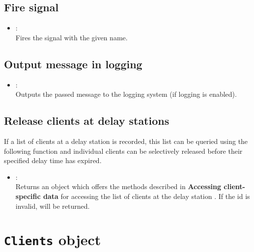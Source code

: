 \section{Fire signal}

\begin{itemize}

\item
{}:\\
Fires the signal with the given name.

\end{itemize}

\section{Output message in logging}

\begin{itemize}

\item
{}:\\
Outputs the passed message to the logging system (if logging is enabled).

\end{itemize}

\section{Release clients at delay stations}

If a list of clients at a delay station is recorded, this list can be queried using the
following function and individual clients can be selectively released before their
specified delay time has expired.

\begin{itemize}

\item
{}:\\
Returns an object which offers the methods described in \textbf{Accessing client-specific data}
for accessing the list of clients at the delay station . If the id is invalid, 
will be returned.

\end{itemize}



\chapter{\texttt{Clients} object}


